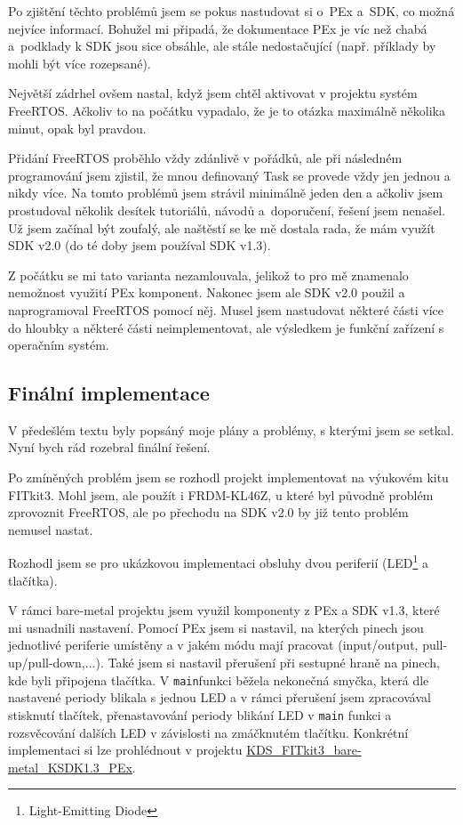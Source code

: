 \documentclass[a4paper]{article}
\begin{document}
Po zjištění těchto problémů jsem se pokus nastudovat si o~PEx a~SDK, co možná nejvíce informací. Bohužel mi připadá, že dokumentace PEx je víc než chabá a~podklady k SDK jsou sice obsáhle, ale stále nedostačující (např. příklady by mohli být více rozepsané).

Největší zádrhel ovšem nastal, když jsem chtěl aktivovat v projektu systém FreeRTOS. Ačkoliv to na počátku vypadalo, že je to otázka maximálně několika minut, opak byl pravdou. 

Přidání FreeRTOS proběhlo vždy zdánlivě v pořádků, ale při následném programování jsem zjistil, že mnou definovaný Task se provede vždy jen jednou a nikdy více. Na tomto problémů jsem strávil minimálně jeden den a ačkoliv jsem prostudoval několik desítek tutoriálů, návodů a~doporučení, řešení jsem nenašel. Už jsem začínal být zoufalý, ale naštěstí se ke mě dostala rada, že mám využít SDK v2.0 (do té doby jsem používal SDK v1.3). 

Z počátku se mi tato varianta nezamlouvala, jelikož to pro mě znamenalo nemožnost využití PEx komponent. Nakonec jsem ale SDK v2.0 použil a naprogramoval FreeRTOS pomocí něj. Musel jsem nastudovat některé části více do hloubky a některé části neimplementovat, ale výsledkem je funkční zařízení s operačním systém. 

\subsection{Finální implementace}

V předešlém textu byly popsáný moje plány a problémy, s kterými jsem se setkal. Nyní bych rád rozebral finální řešení.

Po zmíněných problém jsem se rozhodl projekt implementovat na výukovém kitu FITkit3. Mohl jsem, ale použít i FRDM-KL46Z, u které byl původně problém zprovoznit FreeRTOS, ale po přechodu na SDK v2.0 by již tento problém nemusel nastat.

Rozhodl jsem se pro ukázkovou implementaci obsluhy dvou periferií (LED\footnote{Light-Emitting Diode} a tlačítka). 

V rámci bare-metal projektu jsem využil komponenty z PEx a SDK v1.3, které mi usnadnili nastavení. Pomocí PEx jsem si nastavil, na kterých pinech jsou jednotlivé periferie umístěny a v jakém módu mají pracovat (input/output, pull-up/pull-down,...). Také jsem si nastavil přerušení při sestupné hraně na pinech, kde byli připojena tlačítka. V \verb|main|funkci běžela nekonečná smyčka, která dle nastavené periody blikala s jednou LED a v rámci přerušení jsem zpracovával stisknutí tlačítek, přenastavování periody blikání LED v \verb|main| funkci a rozsvěcování dalších LED v závislosti na zmáčknutém tlačítku. Konkrétní implementaci si lze prohlédnout v projektu \href{https://github.com/JarekParal/IMP-project/tree/master/projects/KDS_FITkit3_bare-metal_KSDK1.3_PEx}{KDS\_FITkit3\_bare-metal\_KSDK1.3\_PEx}. 
\end{document}
